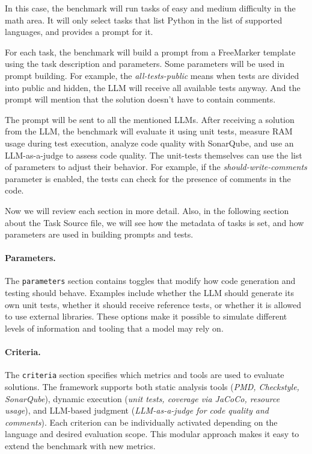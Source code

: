 In this case, the benchmark will run tasks of easy and medium difficulty in the math area.
It will only select tasks that list Python in the list of supported languages, and provides a prompt for it.

For each task, the benchmark will build a prompt from a FreeMarker template using the task description and parameters.
Some parameters will be used in prompt building.
For example, the \textit{all-tests-public} means when tests are divided into public and hidden, the LLM will receive all available tests anyway.
And the prompt will mention that the solution doesn't have to contain comments.

The prompt will be sent to all the mentioned LLMs. After receiving a solution from the LLM, the benchmark will evaluate it using unit tests, measure RAM usage during test execution, analyze code quality with SonarQube, and use an LLM-as-a-judge to assess code quality.
The unit-tests themselves can use the list of parameters to adjust their behavior.
For example, if the \textit{should-write-comments} parameter is enabled, the tests can check for the presence of comments in the code.

Now we will review each section in more detail.
Also, in the following section about the Task Source file, we will see how the metadata of tasks is set, and how parameters are used in building prompts and tests.

\paragraph{Parameters.}
The \texttt{parameters} section contains toggles that modify how code generation and testing should behave.
Examples include whether the LLM should generate its own unit tests, whether it should receive reference tests, or whether it is allowed to use external libraries.
These options make it possible to simulate different levels of information and tooling that a model may rely on.

\paragraph{Criteria.}
The \texttt{criteria} section specifies which metrics and tools are used to evaluate solutions.
The framework supports both static analysis tools (\emph{PMD, Checkstyle, SonarQube}), dynamic execution (\emph{unit tests, coverage via JaCoCo, resource usage}), and LLM-based judgment (\emph{LLM-as-a-judge for code quality and comments}).
Each criterion can be individually activated depending on the language and desired evaluation scope.
This modular approach makes it easy to extend the benchmark with new metrics.


